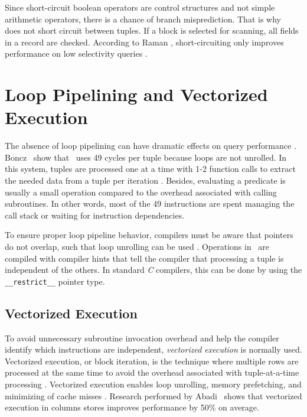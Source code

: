 Since short-circuit boolean operators are control structures and not simple arithmetic operators, there is a chance of branch misprediction. That is why \blink~\cite{Raman2008-gi, Johnson2008-cp} does not short circuit between tuples. If a block is selected for scanning, all fields in a record are checked. According to Raman \ea, short-circuiting only improves performance on low selectivity queries \cite{Raman2008-gi}.


\section{Loop Pipelining and Vectorized Execution}
\label{sec:Loop Pipelining and Vectorized Execution}
The absence of loop pipelining can have dramatic effects on query performance \cite{Boncz2005-wj}. Boncz \ea~show that \mysql~uses 49 cycles per tuple because loops are not unrolled. In this system, tuples are processed one at a time with 1-2 function calls to extract the needed data from a tuple per iteration \cite{Abadi2008-dd}. Besides, evaluating a predicate is usually a small operation compared to the overhead associated with calling subroutines. In other words, most of the 49 instructions are spent managing the call stack or waiting for instruction dependencies.

To ensure proper loop pipeline behavior, compilers must be aware that pointers do not overlap, such that loop unrolling can be used \cite{Boncz2005-wj}. Operations in \monetx~are compiled with compiler hints that tell the compiler that processing a tuple is independent of the others. In standard \textit{C} compilers, this can be done by using the \texttt{\_\_restrict\_\_} pointer type.


\subsection{Vectorized Execution}
\label{sub:Vectorized Execution}
To avoid unnecessary subroutine invocation overhead and help the compiler identify which instructions are independent, \textit{vectorized execution} is normally used. Vectorized execution, or block iteration, is the technique where multiple rows are processed at the same time to avoid the overhead associated with tuple-at-a-time processing \cite{Abadi2008-dd}. Vectorized execution enables loop unrolling, memory prefetching, and minimizing of cache misses \cite{Larson2013-mc}. Research performed by Abadi \ea~shows that vectorized execution in columns stores improves performance by 50\% on average.


